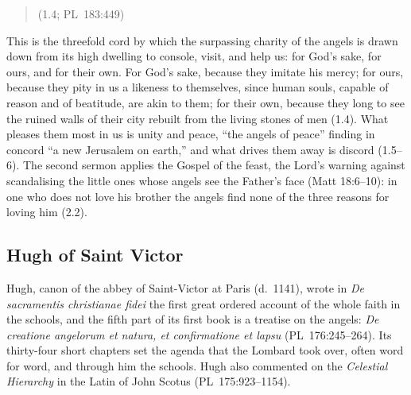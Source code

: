 \begin{quote}
 (1.4; PL~183:449)
\end{quote}

\noindent This is the threefold cord by which the surpassing charity of the
angels is drawn down from its high dwelling to console, visit, and help us:
for God's sake, for ours, and for their own. For God's sake, because they
imitate his mercy; for ours, because they pity in us a likeness to
themselves, since human souls, capable of reason and of beatitude, are akin
to them; for their own, because they long to see the ruined walls of their
city rebuilt from the living stones of men (1.4). What pleases them most in
us is unity and peace, ``the angels of peace'' finding in concord ``a new
Jerusalem on earth,'' and what drives them away is discord (1.5--6). The
second sermon applies the Gospel of the feast, the Lord's warning against
scandalising the little ones whose angels see the Father's face (Matt
18:6--10): in one who does not love his brother the angels find none of the
three reasons for loving him (2.2).

\sectionguard
\subsection{Hugh of Saint Victor}\label{sec:fa-hugh}

Hugh, canon of the abbey of Saint-Victor at Paris (d.~1141), wrote in
\emph{De sacramentis christianae fidei} the first great ordered account of
the whole faith in the schools, and the fifth part of its first book is a
treatise on the angels: \emph{De creatione angelorum et natura, et
confirmatione et lapsu} (PL~176:245--264). Its thirty-four short chapters set
the agenda that the Lombard took over, often word for word, and through him
the schools. Hugh also commented on the \emph{Celestial Hierarchy} in the
Latin of John Scotus (PL~175:923--1154).

